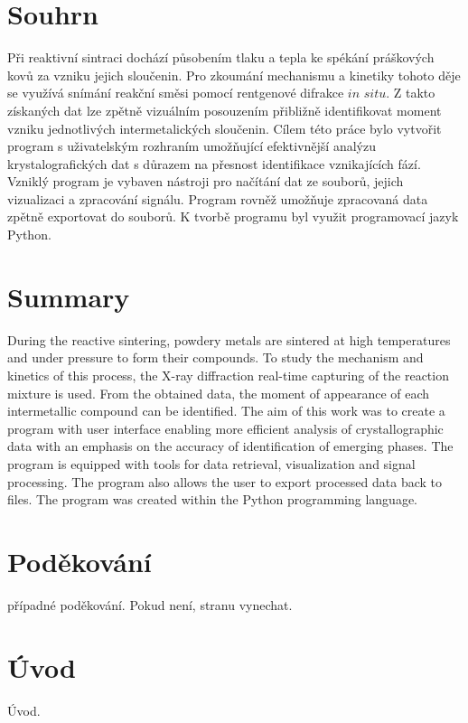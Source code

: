 \documentclass[a4paper, 12pt]{article}
\begin{document}
\section*{Souhrn}
Při reaktivní sintraci dochází působením tlaku a tepla ke spékání práškových kovů za vzniku jejich sloučenin. Pro zkoumání mechanismu a kinetiky tohoto děje se využívá snímání reakční směsi pomocí rentgenové difrakce $in$ $situ$. Z takto získaných dat lze zpětně vizuálním posouzením přibližně identifikovat  moment vzniku jednotlivých intermetalických sloučenin. Cílem této práce bylo vytvořit program s uživatelským rozhraním umožňující efektivnější analýzu krystalografických dat s důrazem na přesnost identifikace vznikajících fází. Vzniklý program je vybaven nástroji pro načítání dat ze souborů, jejich vizualizaci a zpracování signálu. Program rovněž umožňuje zpracovaná data zpětně exportovat do souborů. K tvorbě programu byl využit programovací jazyk Python.

\section*{Summary}
During the reactive sintering, powdery metals are sintered at high temperatures and under pressure to form their compounds. To study the mechanism and kinetics of this process, the X-ray diffraction real-time capturing of the reaction mixture is used. From the obtained data, the moment of appearance of each intermetallic compound can be identified. The aim of this work was to create a program with user interface enabling more efficient analysis of crystallographic data with an emphasis on the accuracy of identification of emerging phases. The program is equipped with tools for data retrieval, visualization and signal processing. The program also allows the user to export processed data back to files. The program was created within the Python programming language.
\newpage

\section*{Poděkování}
případné poděkování. Pokud není, stranu vynechat.
\newpage

\tableofcontents
\newpage

\section{Úvod}
Úvod.
\end{document}
